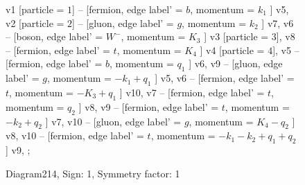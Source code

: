 \documentclass{revtex4}
\begin{document}
\begin{figure}[!htb]
\begin{center}
{    %
v1 [particle = \(1\)] -- [fermion, edge label' = \(b\), momentum = \(k_{1}\) ] v5, 
v2 [particle = \(2\)] -- [gluon, edge label' = \(g\), momentum = \(k_{2}\) ] v7, 
v6 -- [boson, edge label' = \(W^{-}\), momentum = \(K_{3}\) ] v3 [particle = \(3\)], 
v8 -- [fermion, edge label' = \(t\), momentum = \(K_{4}\) ] v4 [particle = \(4\)], 
v5 -- [fermion, edge label' = \(b\), momentum = \(q_{1}\) ] v6, 
v9 -- [gluon, edge label' = \(g\), momentum = \(-k_{1} + q_{1}\) ] v5, 
v6 -- [fermion, edge label' = \(t\), momentum = \(-K_{3} + q_{1}\) ] v10, 
v7 -- [fermion, edge label' = \(t\), momentum = \(q_{2}\) ] v8, 
v9 -- [fermion, edge label' = \(t\), momentum = \(-k_{2} + q_{2}\) ] v7, 
v10 -- [gluon, edge label' = \(g\), momentum = \(K_{4} - q_{2}\) ] v8, 
v10 -- [fermion, edge label' = \(t\), momentum = \(-k_{1} - k_{2} + q_{1} + q_{2}\) ] v9, 
};
\end{center}
\caption{Diagram214, Sign: 1, Symmetry factor: 1}
\end{figure}
\newpage
\end{document}
